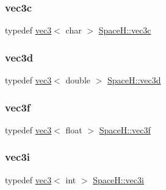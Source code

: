 \mbox{\label{namespace_space_h_a71ddf63ddf9cb9eacec4736fcc26069e}} 
\subsubsection{\texorpdfstring{vec3c}{vec3c}}
{\footnotesize\ttfamily typedef \mbox{\hyperlink{struct_space_h_1_1vec3}{vec3}}$<$ char $>$ \mbox{\hyperlink{namespace_space_h_a71ddf63ddf9cb9eacec4736fcc26069e}{Space\+H\+::vec3c}}}

\mbox{\label{namespace_space_h_a40a777c164ba1950a91c16ceb2f6b49b}} 
\subsubsection{\texorpdfstring{vec3d}{vec3d}}
{\footnotesize\ttfamily typedef \mbox{\hyperlink{struct_space_h_1_1vec3}{vec3}}$<$ double $>$ \mbox{\hyperlink{namespace_space_h_a40a777c164ba1950a91c16ceb2f6b49b}{Space\+H\+::vec3d}}}

\mbox{\label{namespace_space_h_adeaed06a5c38dda2c6abb109b613b55c}} 
\subsubsection{\texorpdfstring{vec3f}{vec3f}}
{\footnotesize\ttfamily typedef \mbox{\hyperlink{struct_space_h_1_1vec3}{vec3}}$<$ float $>$ \mbox{\hyperlink{namespace_space_h_adeaed06a5c38dda2c6abb109b613b55c}{Space\+H\+::vec3f}}}

\mbox{\label{namespace_space_h_a696554c861c967a8a06e500ab6582fab}} 
\subsubsection{\texorpdfstring{vec3i}{vec3i}}
{\footnotesize\ttfamily typedef \mbox{\hyperlink{struct_space_h_1_1vec3}{vec3}}$<$ int $>$ \mbox{\hyperlink{namespace_space_h_a696554c861c967a8a06e500ab6582fab}{Space\+H\+::vec3i}}}

\mbox{\label{namespace_space_h_a0c8b216d20ae8dce524bf2a14974a9e0}} 
